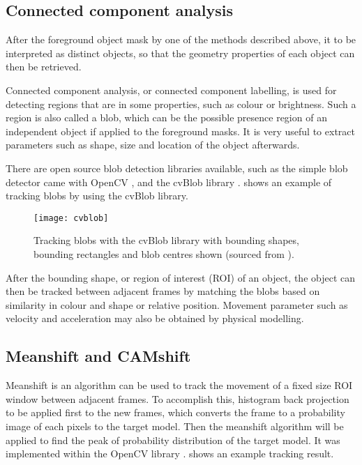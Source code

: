 \subsection{Connected component analysis}
\label{blob}

After  the foreground object mask by one of the methods described above, it  to be interpreted as distinct objects, so that the geometry properties of each object can then be retrieved.

Connected component analysis, or connected component labelling, is used for detecting regions that are  in some properties, such as colour or brightness. Such a region is also called a blob, which can be the possible presence region of an independent object if applied to the foreground masks. It is very useful to extract parameters such as shape, size and location of the object afterwards.

There are open source blob detection libraries available, such as the simple blob detector came with OpenCV \cite{opencv:blob}, and the cvBlob library \cite{cvblob}.  shows an example of tracking blobs by using the cvBlob library.


\begin{figure}[H]
  \centering
  \texttt{[image: cvblob]}
  \caption{Tracking blobs with the cvBlob library with bounding shapes, bounding rectangles and blob centres shown (sourced from \cite{cvblob}).}
  \label{cvblob}
\end{figure}

After  the bounding shape, or region of interest (ROI) of an object, the object can then be tracked between adjacent frames by matching the blobs based on similarity in colour and shape or relative position. Movement parameter such as velocity and acceleration may also be obtained by physical modelling.

\subsection{Meanshift and CAMshift}

Meanshift \cite{fukunaga2013introduction} is an algorithm  can be used to track the movement of a fixed size ROI window between adjacent frames. To accomplish this, histogram back projection  to be applied first to the new frames, which converts the frame to a probability image of each pixels  to the target model. Then the meanshift algorithm will be applied to find the peak of probability distribution of the target model. It was implemented within the OpenCV library \cite{opencv:camshift}.  shows an example tracking result.

